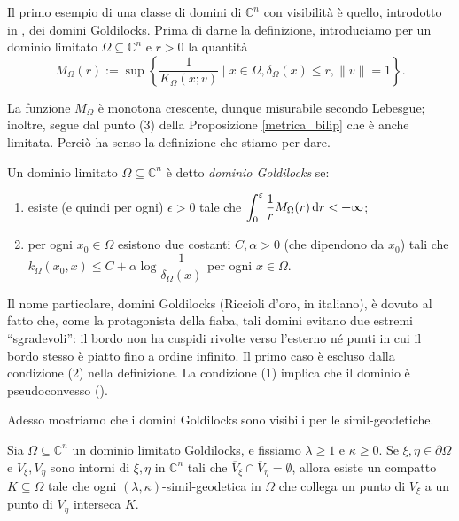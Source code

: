 Il primo esempio di una classe di domini di $\mathbb{C}^n$ con visibilità è quello, introdotto in \cite{BZ1}, dei domini Goldilocks. Prima di darne la definizione, introduciamo per un dominio limitato $\Omega\subseteq\mathbb{C}^n$ e $r>0$ la quantità
$$M_\Omega(r):=\sup\left\{\frac{1}{K_\Omega(x;v)}\mid x\in\Omega,\delta_\Omega(x) \le r, \|v\|=1\right\}.$$

La funzione $M_\Omega$ è monotona crescente, dunque misurabile secondo Lebesgue; inoltre, segue dal punto (3) della Proposizione \ref{metrica_bilip} che è anche limitata. Perciò ha senso la definizione che stiamo per dare.

\begin{defn} \label{gold}
    Un dominio limitato $\Omega\subseteq\mathbb{C}^n$ è detto \textit{dominio Goldilocks} se:
    \begin{enumerate}[label={(\arabic*)}]
        \item esiste (e quindi per ogni) $\epsilon>0$ tale che $\displaystyle\int_0^{\varepsilon} \frac{1}{r}M_\Omega(r)\mathop{}\!\mathrm{d} r<+\infty$;
        \item per ogni $x_0\in\Omega$ esistono due costanti $C,\alpha>0$ (che dipendono da $x_0$) tali che $k_\Omega(x_0,x) \le C+\alpha\log{\dfrac{1}{\delta_\Omega(x)}}$ per ogni $x\in\Omega$.
    \end{enumerate}
\end{defn}

\begin{oss}
    Il nome particolare, domini Goldilocks (Riccioli d'oro, in italiano), è dovuto al fatto che, come la protagonista della fiaba, tali domini evitano due estremi ``sgradevoli'': il bordo non ha cuspidi rivolte verso l'esterno né punti in cui il bordo stesso è piatto fino a ordine infinito. Il primo caso è escluso dalla condizione (2) nella definizione. La condizione (1) implica che il dominio è pseudoconvesso (\cite[Proposition 2.15]{BZ1}).
\end{oss}

Adesso mostriamo che i domini Goldilocks sono visibili per le simil-geodetiche.

\begin{thm} \label{gold_is_vis}
    Sia $\Omega\subseteq\mathbb{C}^n$ un dominio limitato Goldilocks, e fissiamo $\lambda\ge 1$ e $\kappa\ge 0$. Se $\xi,\eta\in\partial\Omega$ e $V_\xi,V_\eta$ sono intorni di $\xi,\eta$ in $\mathbb{C}^n$ tali che $\overline{V}_\xi\cap\overline{V}_\eta=\emptyset$, allora esiste un compatto $K\subseteq\Omega$ tale che ogni $(\lambda,\kappa)$-simil-geodetica in $\Omega$ che collega un punto di $V_\xi$ a un punto di $V_\eta$ interseca $K$.
\end{thm}


